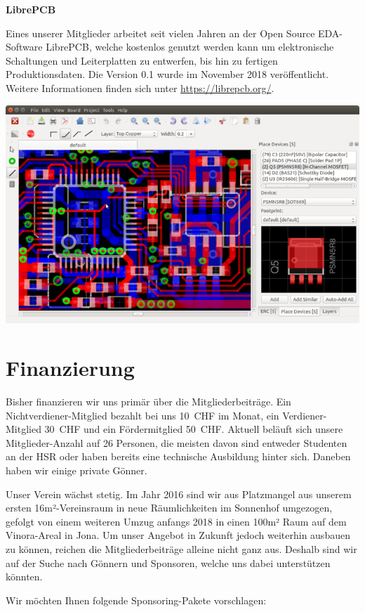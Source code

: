 \documentclass[10pt,a4paper,parskip,fleqn]{scrartcl}
\newcommand{\membercount}{26}
\begin{document}
\textbf{LibrePCB}

Eines unserer Mitglieder arbeitet seit vielen Jahren an der Open Source
EDA-Software LibrePCB, welche kostenlos genutzt werden kann um elektronische
Schaltungen und Leiterplatten zu entwerfen, bis hin zu fertigen
Produktionsdaten. Die Version 0.1 wurde im November 2018 veröffentlicht. Weitere
Informationen finden sich unter \url{https://librepcb.org/}.

\includegraphics[width=\textwidth]{img/librepcb.png}

\section{Finanzierung}

Bisher finanzieren wir uns primär über die Mitgliederbeiträge. Ein
Nichtverdiener-Mitglied bezahlt bei uns 10~CHF im Monat, ein Verdiener-Mitglied
30~CHF und ein Fördermitglied 50~CHF. Aktuell beläuft sich unsere
Mitglieder-Anzahl auf \membercount{} Personen, die meisten davon sind entweder
Studenten an der HSR oder haben bereits eine technische Ausbildung hinter sich.
Daneben haben wir einige private Gönner.

Unser Verein wächst stetig. Im Jahr 2016 sind wir aus Platzmangel aus unserem
ersten 16m²-Vereinsraum in neue Räumlichkeiten im Sonnenhof umgezogen, gefolgt
von einem weiteren Umzug anfangs 2018 in einen 100m² Raum auf dem Vinora-Areal
in Jona. Um unser Angebot in Zukunft jedoch weiterhin ausbauen zu können,
reichen die Mitgliederbeiträge alleine nicht ganz aus. Deshalb sind wir auf der
Suche nach Gönnern und Sponsoren, welche uns dabei unterstützen könnten.

Wir möchten Ihnen folgende Sponsoring-Pakete vorschlagen:
\end{document}

